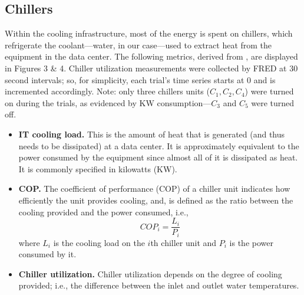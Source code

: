 \documentclass[10pt]{report}
\begin{document}
 \subsection{Chillers}
Within the cooling infrastructure, most of the energy is spent on chillers, which refrigerate the coolant---water, in our case---used to extract heat from the equipment in the data center.
 The following metrics, derived from \cite{Patnaik2009}, are displayed in Figures 3 \& 4. Chiller utilization measurements were collected by FRED at 30 second intervals; so, for simplicity, each trial's time series starts at 0 and is incremented accordingly. Note: only three chillers units ($C_1,C_2,C_4$) were turned on during the trials, as evidenced by KW consumption---$C_3$ and $C_5$ were turned off. 
 \begin{itemize}
   \item
   {\bf IT cooling load.} This is the amount of heat that is generated (and thus needs to be dissipated) at a data center. It is approximately equivalent to the power consumed by the equipment since almost all of it is dissipated as heat. It is commonly specified in kilowatts (KW).
 \item
   {\bf COP.} The coefficient of performance (COP) of a chiller unit indicates how efficiently the unit provides cooling, and, is defined as the ratio between the cooling provided and the power consumed, i.e.,
   \begin{equation}
     COP_i = \frac{L_i}{P_i}\label{cop}
 \end{equation}
where $L_i$ is the cooling load on the $i$th chiller unit and $P_i$ is the power consumed by it.
\item {\bf Chiller utilization.} Chiller utilization depends on the degree of cooling provided; i.e., the difference between the inlet and outlet water temperatures.
\end{itemize}
\end{document}
